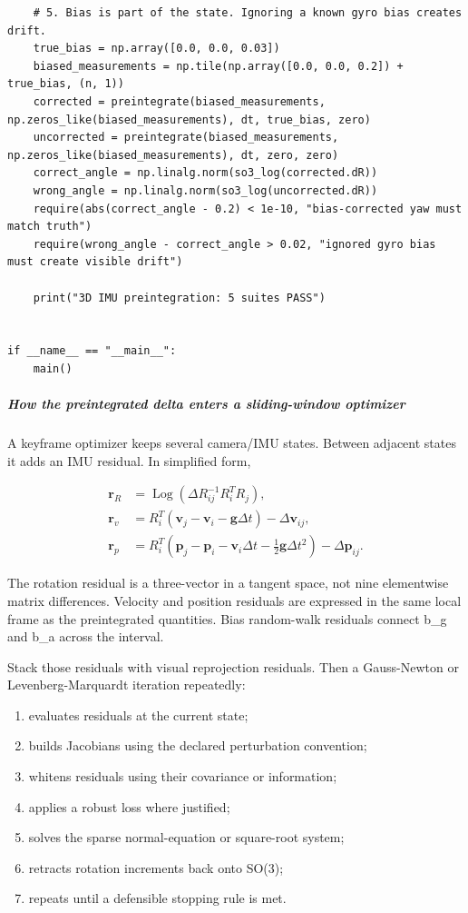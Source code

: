 \begin{verbatim}
    # 5. Bias is part of the state. Ignoring a known gyro bias creates drift.
    true_bias = np.array([0.0, 0.0, 0.03])
    biased_measurements = np.tile(np.array([0.0, 0.0, 0.2]) + true_bias, (n, 1))
    corrected = preintegrate(biased_measurements, np.zeros_like(biased_measurements), dt, true_bias, zero)
    uncorrected = preintegrate(biased_measurements, np.zeros_like(biased_measurements), dt, zero, zero)
    correct_angle = np.linalg.norm(so3_log(corrected.dR))
    wrong_angle = np.linalg.norm(so3_log(uncorrected.dR))
    require(abs(correct_angle - 0.2) < 1e-10, "bias-corrected yaw must match truth")
    require(wrong_angle - correct_angle > 0.02, "ignored gyro bias must create visible drift")

    print("3D IMU preintegration: 5 suites PASS")


if __name__ == "__main__":
    main()
\end{verbatim}

\subparagraph{How the preintegrated delta enters a sliding-window optimizer}\label{how-the-preintegrated-delta-enters-a-sliding-window-optimizer}

A keyframe optimizer keeps several camera/IMU states. Between adjacent states it adds an IMU residual. In simplified form,

\[
\begin{aligned}
\mathbf r_R &= \operatorname{Log}(\Delta R_{ij}^{-1}R_i^TR_j),\\
\mathbf r_v &= R_i^T(\mathbf v_j-\mathbf v_i-\mathbf g\Delta t)-\Delta\mathbf v_{ij},\\
\mathbf r_p &= R_i^T(\mathbf p_j-\mathbf p_i-\mathbf v_i\Delta t-\tfrac12\mathbf g\Delta t^2)-\Delta\mathbf p_{ij}.
\end{aligned}
\]

The rotation residual is a three-vector in a tangent space, not nine elementwise matrix differences. Velocity and position residuals are expressed in the same local frame as the preintegrated quantities. Bias random-walk residuals connect b\_g and b\_a across the interval.

Stack those residuals with visual reprojection residuals. Then a Gauss-Newton or Levenberg-Marquardt iteration repeatedly:

\begin{enumerate}
\def\labelenumi{\arabic{enumi}.}
\tightlist
\item
  evaluates residuals at the current state;
\item
  builds Jacobians using the declared perturbation convention;
\item
  whitens residuals using their covariance or information;
\item
  applies a robust loss where justified;
\item
  solves the sparse normal-equation or square-root system;
\item
  retracts rotation increments back onto SO(3);
\item
  repeats until a defensible stopping rule is met.
\end{enumerate}

